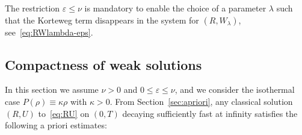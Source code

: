 \documentclass[AHL,Unicode,longabstracts]{cedram}
\newcommand*\<{\left\langle}
\renewcommand*\>{\right\rangle}
\renewcommand*\le{\leqslant}
\begin{document}
\begin{rema}
The restriction $\varepsilon \le \nu$ is mandatory to enable the choice of a parameter $\lambda$ such that the Korteweg term disappears in the system for $(R,W_\lambda)$, see~\eqref{eq:RWlambda-eps}.
\end{rema}

\subsection{Compactness of weak solutions}

In this section we assume $\nu >0$ and $0 \le \varepsilon \le \nu$, and we consider the isothermal case $P(\rho)\equiv \kappa \rho$ with $\kappa >0$. From Section~\ref{sec:apriori}, any classical solution $(R,U)$ to~\eqref{eq:RU} on $(0,T)$ decaying sufficiently fast at infinity satisfies the following a priori estimates:
\end{document}
